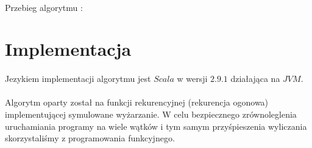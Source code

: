 \documentclass[wide,a4paper,titlepage,12pt] {article}
\begin{document}
\paragraph{}
Przebieg algorytmu :
\lstset{ %
    language=c++,                %
    basicstyle=\scriptsize,       %
    numbers=left,                   %
    numberstyle=\scriptsize,      %
    stepnumber=10,                   %
    numbersep=9pt,                  %
    showspaces=false,               %
    showstringspaces=false,         %
    showtabs=false,                 %
    breaklines=true,                %
    }
    
\section{Implementacja}
\paragraph{}
Jezykiem implementacji algorytmu jest $Scala$ w wersji $2.9.1$ działająca na $JVM$. 
\paragraph{}
Algorytm oparty został na funkcji rekurencyjnej (rekurencja ogonowa) implementującej symulowane wyżarzanie. W celu bezpiecznego zrównoleglenia uruchamiania programy na wiele wątków i tym samym przyśpieszenia wyliczania skorzystaliśmy z programowania funkcyjnego.
\end{document}
